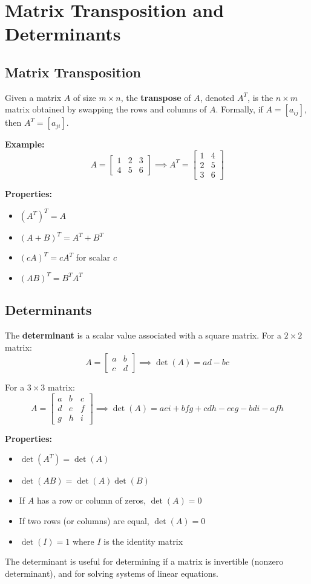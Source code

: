 \section{Matrix Transposition and Determinants}

\subsection{Matrix Transposition}

Given a matrix $A$ of size $m \times n$, the \textbf{transpose} of $A$, denoted $A^T$, is the $n \times m$ matrix obtained by swapping the rows and columns of $A$. Formally, if $A = [a_{ij}]$, then $A^T = [a_{ji}]$.

\textbf{Example:}
\[
A = \begin{bmatrix}
1 & 2 & 3 \\
4 & 5 & 6
\end{bmatrix}
\implies
A^T = \begin{bmatrix}
1 & 4 \\
2 & 5 \\
3 & 6
\end{bmatrix}
\]

\textbf{Properties:}
\begin{itemize}
    \item $(A^T)^T = A$
    \item $(A + B)^T = A^T + B^T$
    \item $(cA)^T = cA^T$ for scalar $c$
    \item $(AB)^T = B^T A^T$
\end{itemize}

\subsection{Determinants}

The \textbf{determinant} is a scalar value associated with a square matrix. For a $2 \times 2$ matrix:
\[
A = \begin{bmatrix}
a & b \\
c & d
\end{bmatrix}
\implies
\det(A) = ad - bc
\]

For a $3 \times 3$ matrix:
\[
A = \begin{bmatrix}
a & b & c \\
d & e & f \\
g & h & i
\end{bmatrix}
\implies
\det(A) = aei + bfg + cdh - ceg - bdi - afh
\]

\textbf{Properties:}
\begin{itemize}
    \item $\det(A^T) = \det(A)$
    \item $\det(AB) = \det(A)\det(B)$
    \item If $A$ has a row or column of zeros, $\det(A) = 0$
    \item If two rows (or columns) are equal, $\det(A) = 0$
    \item $\det(I) = 1$ where $I$ is the identity matrix
\end{itemize}

The determinant is useful for determining if a matrix is invertible (nonzero determinant), and for solving systems of linear equations.